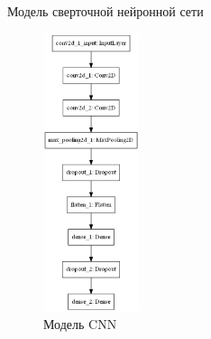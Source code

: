 \begin{frame}{Модель сверточной нейронной сети}
	\begin{figure}
        \includegraphics[width=0.25\textwidth]{img/cnn_model.png}
        \caption{Модель CNN}
    \end{figure}
\end{frame}
